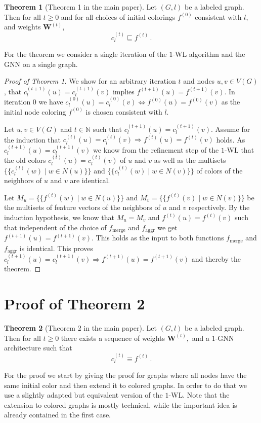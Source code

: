 \documentclass[letterpaper]{article}
\theoremstyle{definition}
\newtheorem{theorem}{Theorem}
\newcommand{\NN}{\mathbb{N}}
\newcommand{\oms}{\{\!\!\{}
\newcommand{\cms}{\}\!\!\}}
\begin{document}
\begin{theorem}[Theorem 1 in the main paper]\label{thm:refine:restated}
	Let $(G, l)$ be a labeled graph. Then for all $t\ge 0$ and for all choices of initial colorings $f^{(0)}$ consistent with $l$, and weights $\mathbf{W}^{(t)}$,
	\begin{equation*}\label{refine}
		c^{(t)}_l \sqsubseteq f^{(t)}\,.
	\end{equation*}
\end{theorem}
For the theorem we consider a single iteration of the $1$-WL algorithm and the GNN on a single graph.
\begin{proof}[Proof of Theorem 1]
	We show for an arbitrary iteration $t$ and nodes $u,v\in V(G)$, that $c_l^{(t+1)}(u) = c_l^{(t+1)}(v)$ implies $f^{(t+1)}(u)=f^{(t+1)}(v)$. In iteration $0$ we have $c_l^{(0)}(u)=c_l^{(0)}(v) \Longleftrightarrow f^{(0)}(u)=f^{(0)}(v)$ as the initial node coloring $f^{(0)}$ is chosen consistent with $l$.
				
	Let $u,v\in V(G)$ and $t\in \NN$ such that $c_l^{(t+1)}(u) = c_l^{(t+1)}(v)$.
	Assume for the induction that $c_l^{(t)}(u)=c_l^{(t)}(v) \Longrightarrow f^{(t)}(u)=f^{(t)}(v)$ holds.
	As $c_l^{(t+1)}(u)= c_l^{(t+1)}(v)$ we know from the refinement step of the $1$-WL that the old colors $c_l^{(t)}(u) = c_l^{(t)}(v)$ of $u$ and $v$ as well as the multisets $\oms c_l^{(t)}(w) \mid w \in N(u) \cms$ and $\oms c_l^{(t)}(w) \mid w \in N(v) \cms$ of colors of the neighbors of $u$ and $v$ are identical.
				
	Let $M_u = \oms f^{(t)}(w) \mid w \in N(u) \cms$ and $M_v = \oms f^{(t)}(v) \mid w \in N(v) \cms$ be the multisets of feature vectors of the neighbors of $u$ and $v$ respectively. By the induction hypothesis, we know that $M_u = M_v$ and $f^{(t)}(u) = f^{(t)}(v)$ such that independent of the choice of $f_\text{merge}$ and $f_\text{aggr}$ we get $f^{(t+1)}(u) = f^{(t+1)}(v)$. This holds as the input to both functions $f_\text{merge}$ and $f_\text{aggr}$ is identical. This proves $c_l^{(t+1)}(u) = c_l^{(t+1)}(v) \Longrightarrow f^{(t+1)}(u)=f^{(t+1)}(v)$ and thereby the theorem.
\end{proof}


\section{Proof of Theorem 2}

\begin{theorem}[Theorem 2 in the main paper]\label{equal:restated}
	Let $(G, l)$ be a labeled graph. Then for all $t\geq 0$ there exists a sequence of weights $\mathbf{W}^{(t)},$ and a $1$-GNN architecture such that 
	\begin{equation*}
		c^{(t)}_l \equiv f^{(t)}\,.
	\end{equation*}
\end{theorem}
For the proof we start by giving the proof for graphs where all nodes have the same initial color and then extend it to colored graphs. 
In order to do that we use a slightly adapted but equivalent version of the $1$-WL.
Note that the extension to colored graphs is mostly technical, while the important idea is already contained in the first case.
\end{document}
